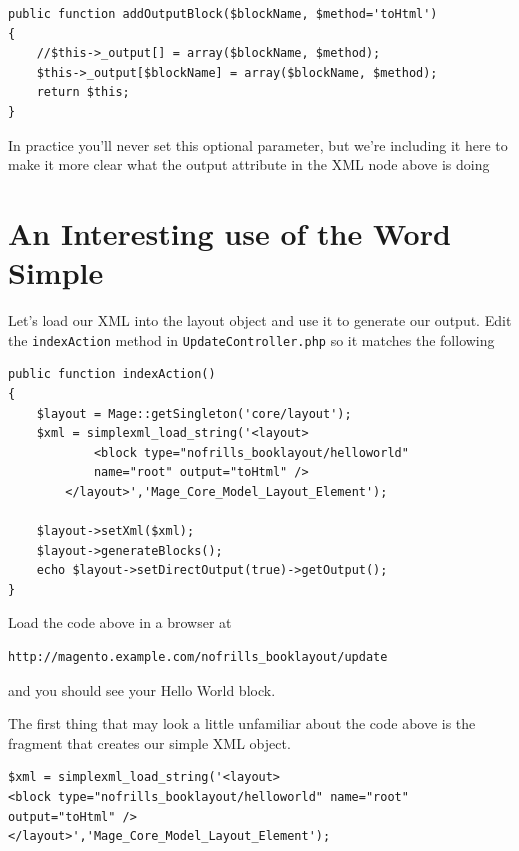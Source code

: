 \documentclass[oneside]{book}
\begin{document}
\begin{lstlisting}
public function addOutputBlock($blockName, $method='toHtml')
{
    //$this->_output[] = array($blockName, $method);
    $this->_output[$blockName] = array($blockName, $method);
    return $this;
}

\end{lstlisting}


In practice you'll never set this optional parameter, but we're including it here to make it more clear what the output attribute in the XML node above is doing

\section{An Interesting use of the Word Simple}

Let's load our XML into the layout object and use it to generate our output.  Edit the \footnotesize\texttt{indexAction} \normalsize  method in \footnotesize\texttt{UpdateController.php} \normalsize  so it matches the following

\begin{lstlisting}
public function indexAction()
{
    $layout = Mage::getSingleton('core/layout');
    $xml = simplexml_load_string('<layout>
            <block type="nofrills_booklayout/helloworld"
            name="root" output="toHtml" />
        </layout>','Mage_Core_Model_Layout_Element');

    $layout->setXml($xml);
    $layout->generateBlocks();
    echo $layout->setDirectOutput(true)->getOutput();
}

\end{lstlisting}


Load the code above in a browser at

\begin{lstlisting}
http://magento.example.com/nofrills_booklayout/update

\end{lstlisting}


and you should see your Hello World block.

The first thing that may look a little unfamiliar about the code above is the fragment that creates our simple XML object.

\begin{lstlisting}
$xml = simplexml_load_string('<layout>
<block type="nofrills_booklayout/helloworld" name="root" output="toHtml" />
</layout>','Mage_Core_Model_Layout_Element');

\end{lstlisting}
\end{document}
